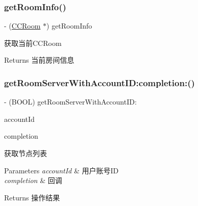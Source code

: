 \subsubsection{\texorpdfstring{get\+Room\+Info()}{getRoomInfo()}}
{\footnotesize\ttfamily -\/ (\hyperlink{interface_c_c_room}{C\+C\+Room} $\ast$) get\+Room\+Info \begin{DoxyParamCaption}{ }\end{DoxyParamCaption}}

获取当前\+C\+C\+Room \begin{DoxyReturn}{Returns}
当前房间信息 
\end{DoxyReturn}
\mbox{\label{interface_c_c_streamer_basic_ac4a54455af6e7d3974a59892244df2df}} 
\subsubsection{\texorpdfstring{get\+Room\+Server\+With\+Account\+I\+D\+:completion\+:()}{getRoomServerWithAccountID:completion:()}}
{\footnotesize\ttfamily -\/ (B\+O\+OL) get\+Room\+Server\+With\+Account\+I\+D\+: \begin{DoxyParamCaption}\item[{(N\+S\+String $\ast$)}]{account\+Id }\item[{completion:(C\+C\+Comletion\+Block)}]{completion }\end{DoxyParamCaption}}

获取节点列表 
\begin{DoxyParams}{Parameters}
{\em account\+Id} & 用户账号\+ID \\
\hline
{\em completion} & 回调 \\
\hline
\end{DoxyParams}
\begin{DoxyReturn}{Returns}
操作结果 
\end{DoxyReturn}
\mbox{\label{interface_c_c_streamer_basic_a78dad7e95f697219990fb73486db9807}} 
